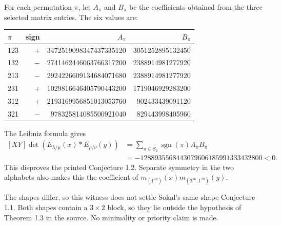 \documentclass[11pt]{article}
\begin{document}
For each permutation \(\pi\), let \(A_\pi\) and \(B_\pi\) be the coefficients obtained from the three selected matrix entries. The six values are:

\begin{center}\small\begin{tabular}{lrrr}\toprule
\(\pi\) & sign & \(A_\pi\) & \(B_\pi\) \\
\midrule
123 & + & 3472519098347437335120 & 3051252895132450 \\
132 & \(-\) & 2741462446063766317200 & 2388914981277920 \\
213 & \(-\) & 2924226609134684071680 & 2388914981277920 \\
231 & + & 1029816646405790443200 & 1719046929283200 \\
312 & + & 2193169956851013053760 & 902433439091120 \\
321 & \(-\) & 978325814085500921040 & 829443998405960 \\
\bottomrule\end{tabular}\end{center}

The Leibniz formula gives
\[
\begin{aligned}
[XY]\det(E_{\lambda/\mu}(x)*E_{\rho/\nu}(y))
&=\sum_{\pi\in S_3}\operatorname{sgn}(\pi)A_\pi B_\pi\\
&=-1288935568443079606185991333432800<0.
\end{aligned}
\]
This disproves the printed Conjecture 1.2. Separate symmetry in the two alphabets also makes this the coefficient of \(m_{(1^{49})}(x)m_{(2^{16},1^{20})}(y)\).

The shapes differ, so this witness does not settle Sokal's same-shape Conjecture 1.1. Both shapes contain a \(3\times2\) block, so they lie outside the hypothesis of Theorem 1.3 in the source. No minimality or priority claim is made.
\end{document}
